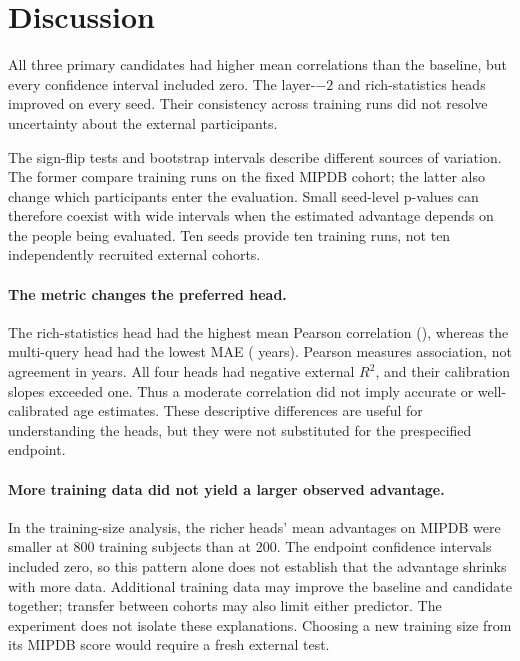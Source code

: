 \section{Discussion}

All three primary candidates had higher mean correlations than the baseline,
but every confidence interval included zero. The layer-$-2$ and rich-statistics
heads improved on every seed. Their consistency across training runs did not
resolve uncertainty about the external participants.

The sign-flip tests and bootstrap intervals describe different sources of
variation. The former compare training runs on the fixed MIPDB cohort; the
latter also change which participants enter the evaluation. Small seed-level
p-values can therefore coexist with wide intervals when the estimated
advantage depends on the people being evaluated. Ten seeds provide ten training
runs, not ten independently recruited external cohorts.

\paragraph{The metric changes the preferred head.}
The rich-statistics head had the highest mean Pearson correlation
(\RichResidualPearson{}), whereas the multi-query head had the lowest MAE
(\MultiQueryMAE{} years). Pearson measures association, not agreement in years.
All four heads had negative external $R^2$, and their calibration slopes
exceeded one. Thus a moderate correlation did not imply accurate or
well-calibrated age estimates. These descriptive differences are useful for
understanding the heads, but they were not substituted for the prespecified
endpoint.

\paragraph{More training data did not yield a larger observed advantage.}
In the training-size analysis, the richer heads' mean advantages on MIPDB were
smaller at 800 training subjects than at 200. The endpoint confidence intervals
included zero, so this pattern alone does not establish that the advantage
shrinks with more data. Additional training data may improve the baseline and
candidate together; transfer between cohorts may also limit either predictor.
The experiment does not isolate these explanations. Choosing a new training
size from its MIPDB score would require a fresh external test.

